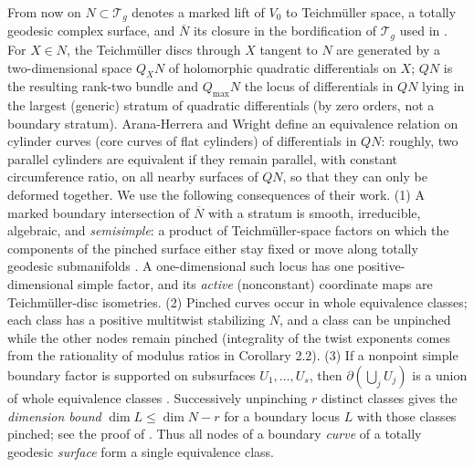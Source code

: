 \documentclass[11pt]{article}
\newcommand{\T}{\mathcal T}
\newcommand{\cl}[1]{\overline{#1}}
\theoremstyle{remark}
\begin{document}
From now on \(N\subset\T_g\) denotes a marked lift of \(V_0\) to
Teichm\"uller space, a totally geodesic complex surface, and
\(\cl N\) its closure in the bordification of \(\T_g\) used in
\cite{AHW}. For
\(X\in N\), the Teichm\"uller discs through \(X\) tangent to \(N\)
are generated by a two-dimensional space \(Q_XN\) of holomorphic
quadratic differentials on \(X\); \(QN\) is the resulting rank-two
bundle and \(Q_{\max}N\) the locus of differentials in \(QN\) lying
in the largest (generic) stratum of quadratic differentials (by
zero orders, not a boundary stratum). Arana-Herrera and Wright
\cite{AHW} define an equivalence relation on cylinder curves (core
curves of flat cylinders) of
differentials in \(QN\): roughly, two parallel cylinders are
equivalent if they remain parallel, with constant circumference
ratio, on all nearby surfaces of \(QN\), so that they can only be
deformed together. We use the following consequences of their work.
(1) A marked boundary intersection of \(\cl N\) with a stratum is
smooth, irreducible, algebraic, and \emph{semisimple}: a product of
Teichm\"uller-space factors on which the components of the pinched
surface either stay fixed or move along totally geodesic
submanifolds \cite[Theorem 1.3]{AHW}. A one-dimensional such locus
has one positive-dimensional simple factor, and its \emph{active}
(nonconstant) coordinate maps are Teichm\"uller-disc isometries.
(2) Pinched curves occur in whole equivalence classes; each
class has a positive multitwist stabilizing \(N\), and a class can
be unpinched while the other nodes remain pinched
\cite[Corollary 2.2, Lemmas 2.6 and 2.13, Corollaries 2.12 and
3.17]{AHW} (integrality of the twist exponents comes from the
rationality of modulus ratios in Corollary 2.2).
(3) If a nonpoint simple boundary factor is supported on
subsurfaces \(U_1,\ldots,U_s\), then
\(\partial(\bigcup_j U_j)\) is a union of whole equivalence classes
\cite[Lemma 6.1(3)]{AHW}.
Successively unpinching \(r\) distinct
classes gives the \emph{dimension bound} \(\dim L\leq\dim N-r\) for
a boundary locus \(L\) with those classes pinched; see the proof of
\cite[Theorem 3.9]{AHW}. Thus all nodes of a boundary \emph{curve}
of a totally geodesic \emph{surface} form a single equivalence class.
\end{document}
